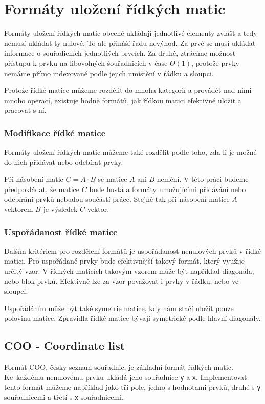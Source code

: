 \chapter{Formáty uložení řídkých matic}

Formáty uložení řídkých matic obecně ukládají jednotlivé elementy zvlášť a tedy nemusí ukládat ty nulové. To ale přináší řadu nevýhod. Za prvé se musí ukládat informace o souřadicních jednotliých prvcích. Za druhé, ztrácíme možnost přístupu k prvku na libovolných šouřadnicích v čase $\Theta(1)$, protože prvky nemáme přímo indexované podle jejich umístění v řádku a sloupci.

Protože řídké matice můžeme rozdělit do mnoha kategorií a provádět nad nimi mnoho operací, existuje hodně formátů, jak řídkou matici efektivně uložit a pracovat s ní.

\subsection{Modifikace řídké matice}

Formáty uložení řídkých matic můžeme také rozdělit podle toho, zda-li je možné do nich přidávat nebo odebírat prvky.

Při násobení matic $C = A \cdot B$ se matice $A$ ani $B$ nemění. V této práci budeme předpokládat, že matice $C$ bude hustá a formáty umožujícími přidávání nebo odebírání prvků nebudou součástí práce. Stejně tak při násobení matice $A$ vektorem $B$ je výsledek $C$ vektor.

\subsection{Uspořádanost řídké matice}

Dalším kritériem pro rozdělení formátů je uspořádanost nenulových prvků v řídké matici. Pro uspořádané prvky bude efektivnější takový formát, který využije určitý vzor. V řídkých maticích takovým vzorem může být například diagonála, nebo blok prvků. Efektivně lze za vzor považovat i prvky v řádku, nebo ve sloupci.

Uspořádáním může být také symetrie matice, kdy nám stačí uložit pouze polovinu matice. Zpravidla řídké matice bývají symetrické podle hlavní diagonály.

\section{COO - Coordinate list}

Formát COO, česky seznam souřadnic, je základní formát řídkých matic. Ke~každému nenulovému prvku ukládá jeho souřadnice \texttt{y} a \texttt{x}. Implementovat tento formát můžeme například jako tři pole, jedno s hodnotami prvků, druhé s \texttt{y} souřadnicemi a třetí s \texttt{x} souřadnicemi.

